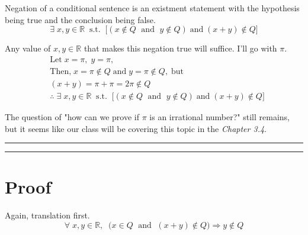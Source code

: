 Negation of a conditional sentence
is an existment statement with the hypothesis
being true and the conclusion being false.
\begin{equation}
	\exists \;
	x,y \in \mathbb{R} \;\; \text{s.t.} \;\;
	\big[ (x \notin Q \; \text{ and } \; y \notin Q)
	\; \text{and} \;
	(x+y) \notin Q \big]
\end{equation}

Any value of $x,y \in \mathbb{R}$
that makes this negation true will suffice.
I'll go with $\pi$.
\begin{align}
	&\text{Let} \;
	x = \pi, \; y = \pi,
	\\
	&\text{Then,} \;
	x = \pi \notin Q \; \text{and} \;
	y = \pi \notin Q, \; \text{but}
	\\
	&(x + y) = \pi + \pi = 2 \pi \notin Q
	\\
	&\therefore \;
	\exists \;
	x,y \in \mathbb{R} \;\; \text{s.t.} \;\;
	\big[ (x \notin Q \; \text{ and } \; y \notin Q)
	\; \text{and} \;
	(x+y) \notin Q \big]
\end{align}

The question of "how can we prove if $\pi$
is an irrational number?" still remains,
but it seems like our class will be covering
this topic in the \textit{Chapter 3.4}.

\newpage

\bgroup
\color{abs}
\hrule
\egroup

\begin{abstract}
	(c) Select a true conjecture from the list and
	give a proof for why it is true.
	
	\: \; \textbf{
		E. If $x$ is rational and $x + y$ is irrational,
		then $y$ is irrational.
	}
	\noindent\textbf{\\}
\end{abstract}

\bgroup
\color{abs}
\hrule
\egroup

\section*{Proof}

Again, translation first.
\begin{equation}
	\forall \;
	x,y \in \mathbb{R}, \; \;
	\big( x \in Q \; \text{ and } \; (x + y) \notin Q \big)
	\Rightarrow
	y \notin Q
\end{equation}

